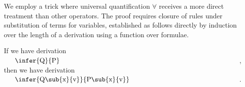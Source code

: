 \documentclass[UKenglish,acmsmall,authorversion]{acmart}
\theoremstyle{plain}
\begin{document}
We employ a trick 
where universal quantification $\forall$ receives a more direct treatment than other operators.
The proof requires closure of rules under substitution of terms for variables, established as follows directly by induction over the length of a derivation using a function over formulae.
\begin{lemma}[Substitution]
\label{lemma:substitution}
If we have derivation $\vcenter{\infer{Q}{P}}$,
then we have derivation $\vcenter{\infer{Q\sub{x}{v}}{P\sub{x}{v}}}$.
\end{lemma}
\end{document}
